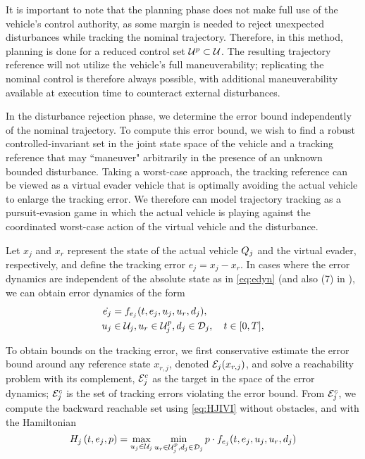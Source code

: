 It is important to note that the planning phase does not make full use of the vehicle's control authority, as some margin is needed to reject unexpected disturbances while tracking the nominal trajectory. Therefore, in this method, planning is done for a reduced control set $\mathcal{U}^p\subset\mathcal{U}$. The resulting trajectory reference will not utilize the vehicle's full maneuverability; replicating the nominal control is therefore always possible, with additional maneuverability available at execution time to counteract external disturbances.

In the disturbance rejection phase, we determine the error bound independently of the nominal trajectory. To compute this error bound, we wish to find a robust controlled-invariant set in the joint state space of the vehicle and a tracking reference that may ``maneuver" arbitrarily in the presence of an unknown bounded disturbance. Taking a worst-case approach, the tracking reference can be viewed as a virtual evader vehicle that is optimally avoiding the actual vehicle to enlarge the tracking error. We therefore can model trajectory tracking as a pursuit-evasion game in which the actual vehicle is playing against the coordinated worst-case action of the virtual vehicle and the disturbance. 

Let $x_j$ and $x_r$ represent the state of the actual vehicle $Q_{j}$ and the virtual evader, respectively, and define the tracking error $e_j=x_j-x_r$. In cases where the error dynamics are independent of the absolute state as in \eqref{eq:edyn} (and also (7) in \cite{Mitchell05}), we can obtain error dynamics of the form
\begin{equation}
\label{eq:edyn} %
\begin{aligned}
\dot{e_j} &= f_{e_j}(t, e_j, u_j, u_r,d_j), \\
u_j &\in \cset_j, u_r\in\cset^p_j, d_j \in \dset_j, \quad t \in [0, T],
\end{aligned}
\end{equation}

To obtain bounds on the tracking error, we first conservative estimate the error bound around any reference state $x_{r,j}$, denoted $\mathcal{E}_j(x_{r,j})$, and solve a reachability problem with its complement, $\mathcal{E}_j^c$ as the target in the space of the error dynamics; $\mathcal{E}_j^c$ is the set of tracking errors violating the error bound. From $\mathcal{E}_j^c$, we compute the backward reachable set using \eqref{eq:HJIVI} without obstacles, and with the Hamiltonian
\vspace{-0.5em}
\begin{equation}
\label{eq:HJIVI_track}
H_j\left(t, e_j, p\right) = \max_{u_j \in \cset_j} \min_{u_r \in\cset^p_j, d_j \in \dset_j} p \cdot f_{e_j}(t, e_j, u_j, u_r,d_j)
\end{equation}

